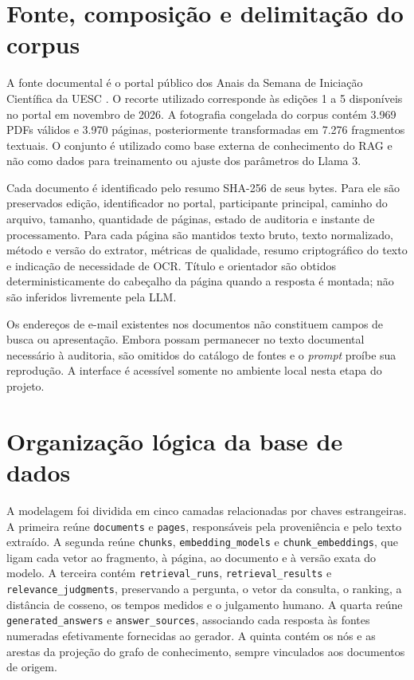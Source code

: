 \section{Fonte, composição e delimitação do corpus}

A fonte documental é o portal público dos Anais da Semana de Iniciação Científica da UESC \cite{sicuescanais}. O recorte utilizado corresponde às edições 1 a 5 disponíveis no portal em novembro de 2026. A fotografia congelada do corpus contém 3.969 PDFs válidos e 3.970 páginas, posteriormente transformadas em 7.276 fragmentos textuais. O conjunto é utilizado como base externa de conhecimento do RAG e não como dados para treinamento ou ajuste dos parâmetros do Llama 3.

Cada documento é identificado pelo resumo SHA-256 de seus bytes. Para ele são preservados edição, identificador no portal, participante principal, caminho do arquivo, tamanho, quantidade de páginas, estado de auditoria e instante de processamento. Para cada página são mantidos texto bruto, texto normalizado, método e versão do extrator, métricas de qualidade, resumo criptográfico do texto e indicação de necessidade de OCR. Título e orientador são obtidos deterministicamente do cabeçalho da página quando a resposta é montada; não são inferidos livremente pela LLM.

Os endereços de e-mail existentes nos documentos não constituem campos de busca ou apresentação. Embora possam permanecer no texto documental necessário à auditoria, são omitidos do catálogo de fontes e o \textit{prompt} proíbe sua reprodução. A interface é acessível somente no ambiente local nesta etapa do projeto.

\section{Organização lógica da base de dados}

A modelagem foi dividida em cinco camadas relacionadas por chaves estrangeiras. A primeira reúne \texttt{documents} e \texttt{pages}, responsáveis pela proveniência e pelo texto extraído. A segunda reúne \texttt{chunks}, \texttt{embedding\_models} e \texttt{chunk\_embeddings}, que ligam cada vetor ao fragmento, à página, ao documento e à versão exata do modelo. A terceira contém \texttt{retrieval\_runs}, \texttt{retrieval\_results} e \texttt{relevance\_judgments}, preservando a pergunta, o vetor da consulta, o ranking, a distância de cosseno, os tempos medidos e o julgamento humano. A quarta reúne \texttt{generated\_answers} e \texttt{answer\_sources}, associando cada resposta às fontes numeradas efetivamente fornecidas ao gerador. A quinta contém os nós e as arestas da projeção do grafo de conhecimento, sempre vinculados aos documentos de origem.

